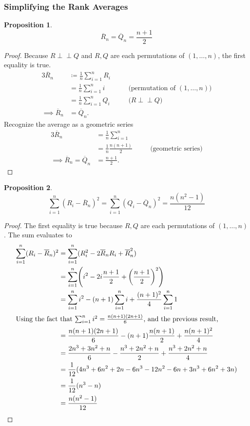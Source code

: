 \documentclass[letterpaper, reqno]{amsart}
\newtheorem{prop}{Proposition}[section]
\numberwithin{equation}{section}
\newcommand{\indep}{\perp \!\!\! \perp}  %
\newcommand{\sumi}[2]{\sum_{#1=1}^{#2}}
\newcommand{\avg}[2]{\frac{1}{#2}\sumi{#1}{#2}}
\newcommand{\by}[1]{&\quad&\text{(#1)}}
\newcommand{\Rnbar}{\overline{R}_n}
\newcommand{\Qnbar}{\overline{Q}_n}
\begin{document}
\subsubsection{Simplifying the Rank Averages}
\begin{prop} \label{prop:rn1}
  \[ \Rnbar = \Qnbar = \frac{n+1}{2} \]
\end{prop}

\begin{proof}
  Because $R \indep Q$ and $R, Q$ are each permutations of $(1, \dots, n)$, the
  first equality is true.
  \begin{alignat*}{3}
    \Rnbar &\coloneqq \avg{i}{n} R_i \\
           &= \avg{i}{n} i \by{permutation of $(1, \dots, n)$} \\
           &= \avg{i}{n} Q_i \by{$R \indep Q$} \\
    \implies \Rnbar &= \Qnbar.
  \end{alignat*}
  Recognize the average as a geometric series
  \begin{alignat*}{3}
    \Rnbar &= \avg{i}{n} \\
           &= \frac{1}{n} \frac{n(n+1)}{2} \by{geometric series} \\
   \implies \Rnbar = \Qnbar &= \frac{n+1}{2}. \tag*{\qedhere}
  \end{alignat*}
\end{proof}

\begin{prop} \label{prop:rn2}
  \[  \sumi{i}{n} (R_i - \Rnbar)^2 = \sumi{i}{n} (Q_i - \Qnbar)^2 = \frac{n(n^2 - 1)}{12} \]
\end{prop}

\begin{proof}
  The first equality is true because $R, Q$ are each permutations of $(1, \dots, n)$.
  The sum evaluates to
  \begin{alignat*}{3}
    \sumi{i}{n} (R_i - \Rnbar)^2 &= \sumi{i}{n} (R_i^2 - 2\Rnbar R_i + \Rnbar^2) \\
    &= \sumi{i}{n} \mleft(i^2 - 2 i \frac{n+1}{2} + \mleft(\frac{n+1}{2}\mright)^2 \mright) \\
    &= \sumi{i}{n} i^2 - (n+1)\sumi{i}{n} i + \frac{(n+1)^2}{4} \sumi{i}{n} 1 \\
    \intertext{Using the fact that $\sumi{i}{n} i^2 = \frac{n(n+1)(2n+1)}{6}$,
      and the previous result,}
    &= \frac{n(n+1)(2n+1)}{6} - (n+1) \frac{n(n+1)}{2} + \frac{n(n+1)^2}{4} \\
    &= \frac{2n^3 + 3n^2 + n}{6} - \frac{n^3 + 2n^2 + n}{2} + \frac{n^3 + 2n^2 + n}{4}  \\
    &= \frac{1}{12} (4n^3 + 6n^2 + 2n - 6n^3 - 12n^2 - 6n + 3n^3 + 6n^2 + 3n) \\
    &= \frac{1}{12} (n^3 - n) \\
    &= \frac{n(n^2 - 1)}{12} \tag*{\qedhere}
  \end{alignat*}
\end{proof}
\end{document}

